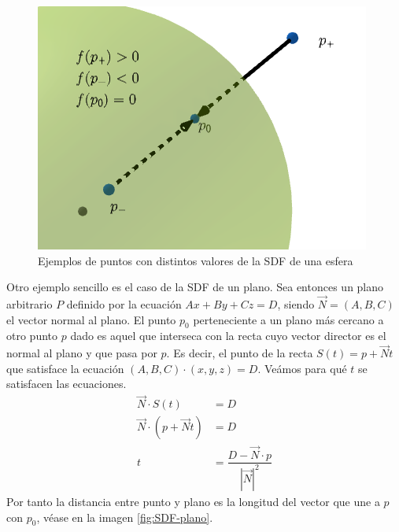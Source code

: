 \begin{figure} [ht]
    \centering
    \includegraphics[scale = 0.5]{img/C9/SDF-esfera.png}
    \caption{Ejemplos de puntos con distintos valores de la SDF de una esfera}
    \label{fig:SDF-esfera}
\end{figure}

Otro ejemplo sencillo es el caso de la SDF de un plano. Sea entonces un plano arbitrario $P$ definido por la ecuación $Ax+By+Cz = D$, siendo $\vec N=(A,B,C)$ el vector normal al plano. El punto $p_0$ perteneciente a un plano más cercano a otro punto $p$ dado es aquel que interseca con la recta cuyo vector director es el normal al plano y que pasa por $p$. Es decir, el punto de la recta $S(t)=p+\vec Nt$ que satisface la ecuación $(A,B,C)\cdot (x,y,z) = D$. Veámos para qué $t$ se satisfacen las ecuaciones.
\begin{equation}
    \label{eq:t-mas-cercano}
    \begin{split}
        \vec N\cdot S(t) &= D \\
        \vec N\cdot (p+\vec N t) &= D \\
        t &= \dfrac{D-\vec N \cdot p}{|\vec N|^2}
    \end{split}
\end{equation}
Por tanto la distancia entre punto y plano es la longitud del vector que une a $p$ con $p_0$, véase en la imagen \ref{fig:SDF-plano}.

